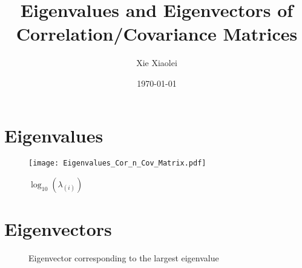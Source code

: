 \documentclass{article}
\title{Eigenvalues and Eigenvectors of Correlation/Covariance Matrices}
\author{Xie Xiaolei}
\date{\today}
\begin{document}
\maketitle
\section{Eigenvalues}
\begin{figure}[htb!]
  \centering
  \texttt{[image: Eigenvalues\_Cor\_n\_Cov\_Matrix.pdf]}  
  \caption{$\log_{10}(\lambda_{(i)})$}
  \label{fig:EigenRatio}
\end{figure}

\section{Eigenvectors}
\begin{figure}[htb!]
  \centering
  \caption{Eigenvector corresponding to the largest eigenvalue}
  \label{fig:Eigenvector_largest_comp}
\end{figure}


\end{document}
